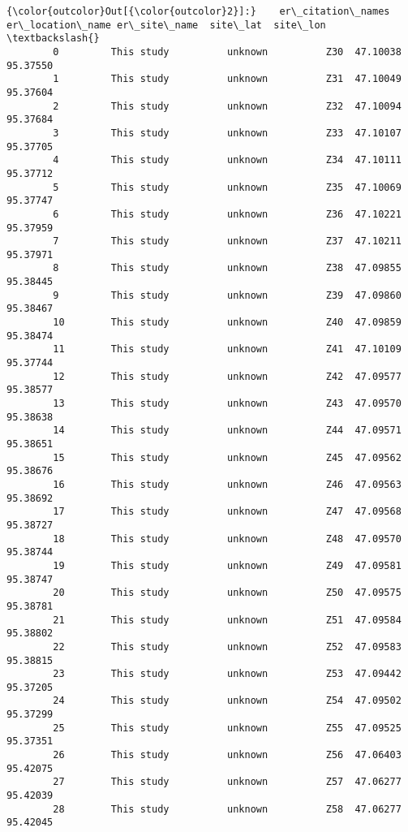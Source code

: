 \documentclass[11pt]{article}
\begin{document}
            \begin{Verbatim}[commandchars=\\\{\}]
{\color{outcolor}Out[{\color{outcolor}2}]:}    er\_citation\_names er\_location\_name er\_site\_name  site\_lat  site\_lon  \textbackslash{}
        0         This study          unknown          Z30  47.10038  95.37550   
        1         This study          unknown          Z31  47.10049  95.37604   
        2         This study          unknown          Z32  47.10094  95.37684   
        3         This study          unknown          Z33  47.10107  95.37705   
        4         This study          unknown          Z34  47.10111  95.37712   
        5         This study          unknown          Z35  47.10069  95.37747   
        6         This study          unknown          Z36  47.10221  95.37959   
        7         This study          unknown          Z37  47.10211  95.37971   
        8         This study          unknown          Z38  47.09855  95.38445   
        9         This study          unknown          Z39  47.09860  95.38467   
        10        This study          unknown          Z40  47.09859  95.38474   
        11        This study          unknown          Z41  47.10109  95.37744   
        12        This study          unknown          Z42  47.09577  95.38577   
        13        This study          unknown          Z43  47.09570  95.38638   
        14        This study          unknown          Z44  47.09571  95.38651   
        15        This study          unknown          Z45  47.09562  95.38676   
        16        This study          unknown          Z46  47.09563  95.38692   
        17        This study          unknown          Z47  47.09568  95.38727   
        18        This study          unknown          Z48  47.09570  95.38744   
        19        This study          unknown          Z49  47.09581  95.38747   
        20        This study          unknown          Z50  47.09575  95.38781   
        21        This study          unknown          Z51  47.09584  95.38802   
        22        This study          unknown          Z52  47.09583  95.38815   
        23        This study          unknown          Z53  47.09442  95.37205   
        24        This study          unknown          Z54  47.09502  95.37299   
        25        This study          unknown          Z55  47.09525  95.37351   
        26        This study          unknown          Z56  47.06403  95.42075   
        27        This study          unknown          Z57  47.06277  95.42039   
        28        This study          unknown          Z58  47.06277  95.42045   
        

\end{Verbatim}
\end{document}
